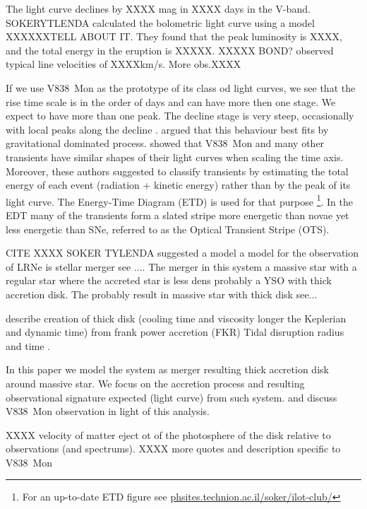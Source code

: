 \documentclass[a4paper,fleqn,usenatbib,useAMS]{mnras}
\begin{document}
The light curve declines by XXXX mag in XXXX days in the V-band.
SOKERYTLENDA calculated the bolometric light curve using a model XXXXXXTELL ABOUT IT.
They found that the peak luminosity is XXXX, and the total energy in the eruption is XXXXX.
XXXXX BOND? observed typical line velocities of XXXXkm/s.
More obs.XXXX


If we use V838~Mon as the prototype of its class od light curves, we see that the rise time scale is in the order of days and can have more then one stage. We expect to have more than one peak. The decline stage is very steep, occasionally with local peaks along the decline \citep{2003MNRAS.341..785C,2005MNRAS.358.1352C}.
\cite{2006A&A...451..223T} argued that this behaviour best fits by gravitational dominated process.
\cite{2010ApJ...709L..11K} showed that V838~Mon and many other transients have similar shapes of their light curves when scaling the time axis.
Moreover, these authors suggested to classify transients by estimating the total energy of each event (radiation $+$ kinetic energy) rather than by the peak of its light curve.
The Energy-Time Diagram (ETD) is used for that purpose \citep{2016RAA....16...99K,2017MNRAS.468.4938K} \footnote{For an up-to-date ETD figure see \url{phsites.technion.ac.il/soker/ilot-club/} }.
In the EDT many of the transients form a slated stripe more energetic than novae yet less energetic than SNe, referred to as the Optical Transient Stripe (OTS).


CITE XXXX SOKER TYLENDA suggested a model a model for the observation of LRNe is stellar merger see ....
The merger in this system a massive star with a regular star where the accreted star is less dens probably a YSO with thick accretion disk.
The probably result in massive star with thick disk see...




describe creation of thick disk (cooling time and viscosity longer the Keplerian and dynamic time) from frank power accretion (FKR)
Tidal disruption radius and time \citep{1988Natur.333..523R}.

In this paper we model the system as merger resulting thick accretion disk around massive star.
We focus on the accretion process and resulting observational signature expected (light curve) from such system.
and discuss V838~Mon observation in light of this analysis.


XXXX velocity of matter eject ot of the photosphere of the disk relative to observations (and spectrums).
XXXX more quotes and description specific to V838~Mon
\end{document}
